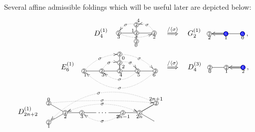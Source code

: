 \documentclass[12pt, leqno]{amsart}
\numberwithin{equation}{section}
\theoremstyle{plain}
\theoremstyle{definition}
\newcommand*\circled[1]{ \fontsize{6}{6}\selectfont \tikz[baseline=(char.base)]{
  \node[shape=circle,draw,inner sep=0.4pt] (char) {#1};} \fontsize{12}{12}\selectfont }
\newcommand*\rcircled[1]{\fontsize{6}{6}\selectfont \tikz[baseline=(char.base)]{
    \node[shape=circle, fill= blue, draw=black, text=white, inner sep=0.4pt] (char) {#1};} \fontsize{12}{12}\selectfont}
\newcommand{\ang}[1]{\langle#1\rangle}
\begin{document}
Several affine admissible foldings which will be useful later are
depicted below:
\begin{align*}
D_4^{(1)}\ \
\raisebox{1.5em}{
\xymatrix@R=1ex@C=4.2ex{
&
*{\circled{2}}<3pt>
   \ar@{-}[d]_>{1}
   \ar@/_0.5pc/@{.>}[dl]|{\sigma}
&
\\
*{\circled{2}}<3pt>
   \ar@{-}[r]_<{3\ \ }
   \ar@/_0.5pc/@{.>}[rr]|{\sigma}
&
*{\circled{2}}<3pt>
   \ar@{-}[r]_>{\ \ 2}
   \ar@{-}[d]
&
*{\circled{2}}<3pt>
   \ar@/_0.5pc/@{.>}[ul]_>{4}|{\sigma}
\\
&
*{\circled{2}}<3pt>
   \ar@{}^>{0}
&
}}
\quad
&\overset{/\ang{\sigma}}{\Longrightarrow}
\quad
G_2^{(1)}\ \
\xymatrix@R=0.5ex@C=3.8ex{
*{\circled{2}}<3pt>
   \ar@{<=}[r]_<{2\ \ }
&
*{\rcircled{6}}<3pt>
   \ar@{-}[r]_<{1\ \ } \ar@{-}[l]
&
*{\rcircled{6}}<3pt>
   \ar@{}[l]^>{\qquad \qquad 0}
},
\\
E_6^{(1)}\ \
\raisebox{2.1em}{
\xymatrix@R=1ex@C=4.2ex{
&& *{\circled{2}}<3pt>
\ar@{}[r]_<{ \ 0 }
   \ar@{-}[d] \ar@/^0.5pc/@{.>}[ddrr]|{\sigma} & \\
&& *{\circled{2}}<3pt> \ar@{-}[d]
   \ar@{-}[d] \ar@/^0.5pc/@{.>}[dr]|{\sigma}
   \ar@{}[r]_<{ \ 2 } & \\
*{\circled{2}}<3pt>\ar@{-}[r]_<{  1 \ }
\ar@/^0.5pc/@{.>}[uurr]|{\sigma}
& *{\circled{2}}<3pt> \ar@{-}[r]_<{ 3 \ }
\ar@/^0.5pc/@{.>}[ur]|{\sigma}
& *{\circled{2}}<3pt> \ar@{-}[r]_<{ 4 \ } & *{\circled{2}}<3pt> \ar@{-}[r]_<{ 5 \ }
\ar@/^1pc/@{.>}[ll]|{\sigma}
& *{\circled{2}}<3pt> \ar@{}[l]^<{ \ 6  }
\ar@/^2pc/@{.>}[llll]|{\sigma}
}}
\quad
&\overset{/\ang{\sigma}}{\Longrightarrow}
\quad
D_4^{(3)}\ \
\xymatrix@R=0.5ex@C=3.8ex{
*{\circled{2}}<3pt>
   \ar@{-}[r]_<{0\ \ }
&
*{\circled{2}}<3pt>
   \ar@{<=}[r]_<{1\ \ }
&
*{\rcircled{6}}<3pt>
   \ar@{}[l]^>{\qquad \qquad 2}
   \ar@{-}[l]
},
\\
D_{2n+2}^{(1)}\ \
\raisebox{1.5em}{
\xymatrix@R=1ex@C=3.8ex{
*{\circled{2}}<3pt>
   \ar@{-}[dr]
   \ar@{}[r]^<{0\ \ }
&&&&&&
*{\circled{2}}<3pt>
   \ar@{-}[dl]
   \ar@/_0.3pc/@{<.}[llllll]|{\sigma}
   \ar@/_2.3pc/@{.>}[ddllllll]|{\sigma}
      \ar@{}[l]_>{ \qquad \qquad 2n+1}
\\
&
*{\circled{2}}<3pt>
   \ar@{-}[r]_<{2\ \ }
   \ar@/^1pc/@{<.>}[rrrr]|{\sigma}
&
*{\circled{2}}<3pt>
   \ar@{-}[r]_<{3\ \ }
   \ar@/_1pc/@{<.>}[rr]|{\sigma}
&
\cdots
   \ar@{-}[r]_<{\qquad \qquad 2n-1 }
&
*{\circled{2}}<3pt>
   \ar@{-}[r]_>{\ \ 2n}
&
*{\circled{2}}<3pt>
   \ar@{-}[ur]
   \ar@{-}[dr]
\\
*{\circled{2}}<3pt>
   \ar@{-}[ur]
   \ar@{}[r]_>{1 \qquad \qquad }
&&&&&&
}}
\end{align*}
\end{document}
